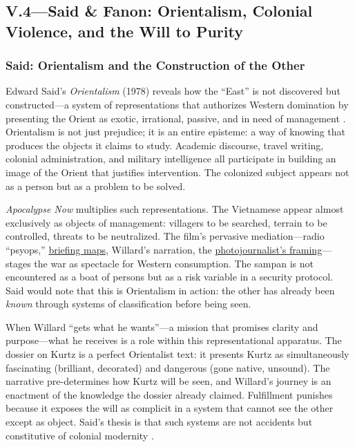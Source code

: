 \subsection*{V.4—Said \& Fanon: Orientalism, Colonial Violence, and the Will to Purity}
\label{ssec:v-said-fanon}

\subsubsection*{Said: Orientalism and the Construction of the Other}
Edward Said's \textit{Orientalism} (1978) reveals how the ``East'' is not discovered but
constructed---a system of representations that authorizes Western domination by presenting the
Orient as exotic, irrational, passive, and in need of management \parencite{SaidOrientalism1978}.
Orientalism is not just prejudice; it is an entire episteme: a way of knowing that produces the
objects it claims to study. Academic discourse, travel writing, colonial administration, and
military intelligence all participate in building an image of the Orient that justifies
intervention. The colonized subject appears not as a person but as a problem to be solved.

\textit{Apocalypse Now} multiplies such representations. The Vietnamese appear almost
exclusively as objects of management: villagers to be searched, terrain to be controlled,
threats to be neutralized. The film's pervasive mediation---radio ``psyops,''
\hyperref[scene:briefing]{briefing maps}, Willard's narration, the
\hyperref[scene:kurtz-compound]{photojournalist's framing}---stages the war as spectacle for
Western consumption. The sampan is not encountered as a boat of persons but as a risk variable in a
security protocol. Said would note that this is Orientalism in action: the other has already
been \emph{known} through systems of classification before being seen.

When Willard ``gets what he wants''---a mission that promises clarity and purpose---what he
receives is a role within this representational apparatus. The dossier on Kurtz is a perfect
Orientalist text: it presents Kurtz as simultaneously fascinating (brilliant, decorated) and
dangerous (gone native, unsound). The narrative pre-determines how Kurtz will be seen, and
Willard's journey is an enactment of the knowledge the dossier already claimed. Fulfillment
punishes because it exposes the will as complicit in a system that cannot see the other except
as object. Said's thesis is that such systems are not accidents but constitutive of colonial
modernity \parencite{SaidOrientalism1978}.

